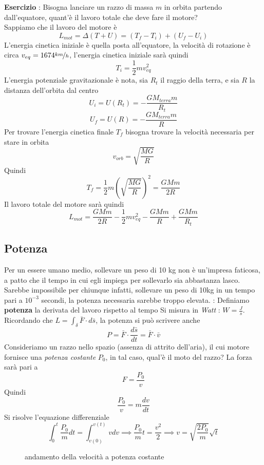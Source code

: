 \documentclass[10pt, letterpaper]{report}
\begin{document}
\textbf{Esercizio} : Bisogna lanciare  un razzo di massa $m$ in orbita partendo dall'equatore, quant'è il lavoro totale che 
deve fare il motore? \\ Sappiamo che il lavoro del motore è $$L_{mot}=\Delta(T+U)=(T_f-T_i)+(U_f-U_i)$$
L'energia cinetica iniziale è quella posta all'equatore, la velocità di rotazione è circa
 $v_{eq}=1674\nicefrac{km}{h}$, l'energia cinetica iniziale sarà quindi $$T_i=\frac{1}{2}mv_{eq}^2$$ 
 L'energia potenziale gravitazionale è nota, sia $R_t$ il raggio della terra, e sia $R$ la distanza dell'orbita dal centro 
 $$ U_i=U(R_{t})=-\frac{GM_{terra}m}{R_{t}}$$ 
 $$ U_f=U(R)=-\frac{GM_{terra}m}{R}$$ 
Per trovare l'energia cinetica finale $T_f$ bisogna trovare la velocità necessaria per stare in orbita
$$ v_{orb}=\sqrt{\frac{MG}{R}}$$
Quindi 
$$ T_f=\frac{1}{2}m(\sqrt{\frac{MG}{R}})^2=\frac{GMm}{2R}$$
Il lavoro totale del motore sarà quindi 
$$ L_{mot}=\frac{GMm}{2R}-\frac{1}{2}mv_{eq}^2-\frac{GMm}{R}+\frac{GMm}{R_t}$$
\subsection{Potenza}
Per un essere umano medio, sollevare un peso di 10 kg non è un'impresa faticosa, a patto che il tempo in cui egli
impiega per sollevarlo sia abbastanza lasco. Sarebbe impossibile per chiunque infatti, sollevare un peso di 10kg in 
un tempo pari a $10^{-3}$ secondi, la potenza necessaria sarebbe troppo elevata.\acc 
{} : Definiamo \textbf{potenza} la derivata del lavoro rispetto al tempo 
Si misura in \textit{Watt} : $W=\frac{J}{s}$.
Ricordando che $L=\int_\delta \bar F\cdot d\bar s$, la potenza si può scrivere anche 
$$ P=\bar F\cdot \frac{d\bar s}{dt}=\bar F\cdot \bar v$$
Consideriamo un razzo nello spazio (assenza di attrito dell'aria), il cui motore fornisce una 
\textit{potenza costante} $P_0$, in tal caso, qual'è il moto del razzo? La forza sarà pari a 
$$ F=\frac{P_0}{v}$$
Quindi 
$$ \frac{P_0}{v}=m\frac{dv}{dt}$$
Si risolve l'equazione differenziale 
$$ \int_0^t\frac{P_0}{m}dt=\int_{v(0)}^{v(t)}vdv\implies \frac{P_0}{m}t=\frac{v^2}{2}\implies v = \sqrt{\frac{2P_0}{m}}\sqrt{t}$$
\begin{figure}[h!]\centering
    \caption{andamento della velocità a potenza costante}
\end{figure}
\end{document}
